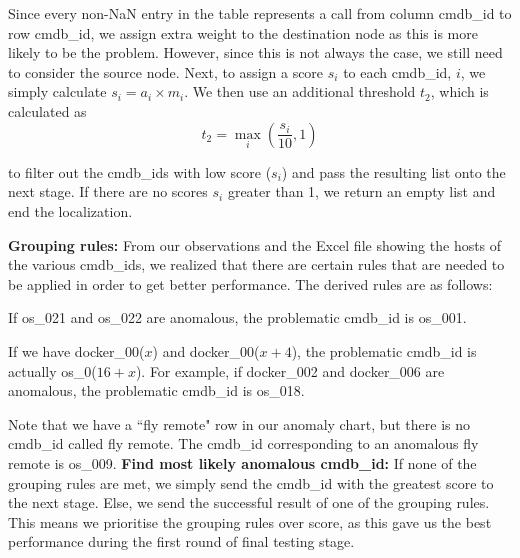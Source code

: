 \documentclass[12pt]{article}
\let\tempone\itemize
\let\temptwo\enditemize
\renewenvironment{itemize}{\tempone\setlength{\itemsep}{0pt}}{\temptwo}
\begin{document}
\noindent Since every non-NaN entry in the table represents a call from column cmdb\_id to row cmdb\_id, we assign extra weight to the destination node as this is more likely to be the problem. However, since this is not always the case, we still need to consider the source node. Next, to assign a score $s_i$ to each cmdb\_id, $i$, we simply calculate $s_i = a_i\times m_i$. We then use an additional threshold $t_2$, which is calculated as
\[
    t_2=\max_{i}\left(\frac{s_i}{10},1\right)
\]

\noindent to filter out the cmdb\_ids with low score ($s_i$) and pass the resulting list onto the next stage. If there are no scores $s_i$ greater than 1, we return an empty list and end the localization.

\smallskip
\noindent \textbf{Grouping rules:} From our observations and the Excel file showing the hosts of the various cmdb\_ids, we realized that there are certain rules that are needed to be applied in order to get better performance. The derived rules are as follows:
\begin{itemize}
    \item If os\_021 and os\_022 are anomalous, the problematic cmdb\_id is os\_001.
    \item If we have docker\_00($x$) and docker\_00($x+4$), the problematic cmdb\_id is actually os\_0($16+x$). For example, if docker\_002 and docker\_006 are anomalous, the problematic cmdb\_id is os\_018.
    \item Note that we have a ``fly remote" row in our anomaly chart, but there is no cmdb\_id called fly remote. The cmdb\_id corresponding to an anomalous fly remote is os\_009.
\end{itemize}
\textbf{Find most likely anomalous cmdb\_id:} If none of the grouping rules are met, we simply send the cmdb\_id with the greatest score to the next stage. Else, we send the successful result of one of the grouping rules. This means we prioritise the grouping rules over score, as this gave us the best performance during the first round of final testing stage.
\end{document}
